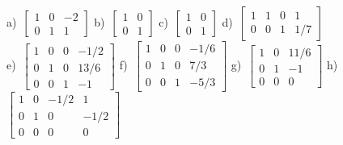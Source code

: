 {%
a)~$\left[\begin{smallmatrix} 1 & 0 & -2 \\ 0 & 1 & 1 \end{smallmatrix}\right]$ \quad b)~$\left[\begin{smallmatrix} 1 & 0 \\ 0 & 1 \end{smallmatrix}\right]$ \quad c)~$\left[\begin{smallmatrix} 1 & 0 \\ 0 & 1 \end{smallmatrix}\right]$ \quad d)~$\left[\begin{smallmatrix} 1 & 1 & 0 & 1 \\ 0 & 0 & 1 & 1/7 \end{smallmatrix}\right]$ \\
e)~$\left[\begin{smallmatrix} 1 & 0 & 0 & -1/2 \\ 0 & 1 & 0 & 13/6 \\ 0 & 0 & 1 & -1  \end{smallmatrix}\right]$ \quad f)~$\left[\begin{smallmatrix} 1 & 0 & 0 & -1/6 \\ 0 & 1 & 0 & 7/3 \\ 0 & 0 & 1 & -5/3 \end{smallmatrix}\right]$ \quad g)~$\left[\begin{smallmatrix} 1 & 0 & 11/6 \\ 0 & 1 & -1 \\ 0 & 0 & 0 \end{smallmatrix}\right]$ \quad h)~$\left[\begin{smallmatrix} 1 & 0 & -1/2 & 1 \\ 0 & 1 & 0 & -1/2 \\ 0 & 0 & 0 & 0 \end{smallmatrix}\right]$
}

